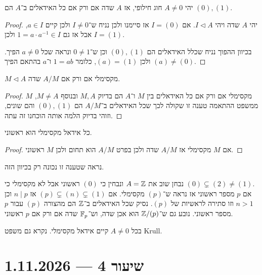 \begin{lemma}
	יהי $A \ne 0$ חוג חילופי, אז $A$ שדה אם ורק אם כל האידאלים ב־$A$ הם $(0), (1)$.
\end{lemma}
\begin{proof}
	יהי $A$ שדה ויהי $I \triangleleft A$.
	אם $I = (0)$ אז סיימנו ולכן נניח ש־$I \ne 0$ ולכן קיים $a \in I$, אבל אז גם $1 = a \cdot a^{-1} \in I$ ולכן $I = (1)$.

	בכיוון ההפוך נניח שכלל האידאלים הם $(0), (1)$ וכן ש־$0 \ne 1$ ונראה שכל $a \ne 0$ הפיך.
	$(a) \ne (0)$ ולכן $(a) = (1)$, כלומר $1 = a b$ ו־$a$ בהתאם הפיך.
\end{proof}
\begin{proposition}
	$M \triangleleft A$ מקסימלי אם ורק אם $A / M$ שדה.
\end{proposition}
\begin{proof}
	$M$ מקסימלי אם ורק אם כל האידאלים בין $M$ ו־$A$ הם בדיוק $M, A$ ובנוסף $M \ne A$, ממשפט ההתאמה טענה זו שקולה לכך שכל האידאלים ב־$A / M$ הם $(0), (1)$ והם שונים, וזוהי בדיוק הלמה אותה הוכחנו זה עתה.
\end{proof}
\begin{corollary}
	כל אידאל מקסימלי הוא ראשוני.
\end{corollary}
\begin{proof}
	אם $M$ מקסימלי אז $A / M$ שדה ולכן בפרט $A / M$ הוא תחום ולכן $M$ ראשוני.
\end{proof}
נראה שטענה זו נכונה רק בכיוון הזה.
\begin{example}
	נבחן שוב את $A = \mathbb{Z}$ ונבחין כי $(0)$ ראשוני אבל לא מקסימלי כי $(0) \subsetneq (2) \ne (1)$. \\
	אם $p$ מספר ראשוני אז נראה ש־$(p)$ מקסימלי.
	אם $(p) \subsetneq (n) \subsetneq (1)$ אז $n \mid p$ וכן $n > 1$ וזו סתירה לראשיות של $(p)$.
	נסיק שכל האידאלים ב־$\mathbb{Z}$ הם מהצורה $(p)$ עבור $p$ מספר ראשוני.
	נובע גם ש־$\mathbb{Z} / (p)$ הוא אכן שדה, וש־$\mathbb{F}_p$ שדה אם ורק אם $p$ ראשוני.
\end{example}
\begin{theorem}
	בכל $A \ne 0$ קיים אידאל מקסימלי.
	נקרא גם משפט Krull.
\end{theorem}

\section{שיעור 4 --- 1.11.2026}
